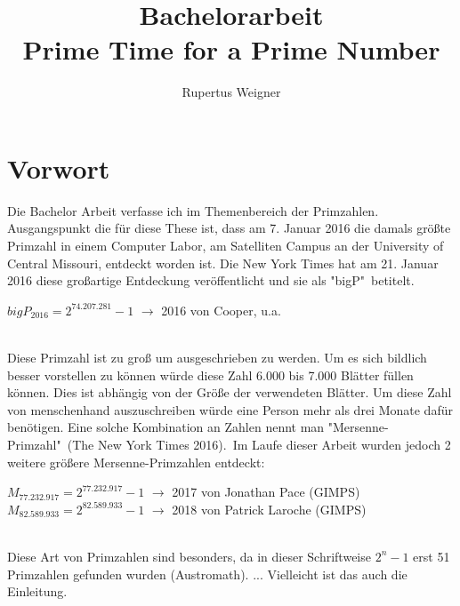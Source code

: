 \documentclass[german,12pt,a4paper]{article}
\title{Bachelorarbeit\\Prime Time for a Prime Number}
\author{Rupertus Weigner}
\begin{document}
\maketitle
\thispagestyle{empty}
\newpage

\section*{Vorwort}
Die Bachelor Arbeit verfasse ich im Themenbereich der Primzahlen. Ausgangspunkt die für diese These ist, dass am 7. Januar 2016 die damals größte Primzahl in einem Computer Labor, am Satelliten Campus an der University of Central Missouri, entdeckt worden ist. Die New York Times hat am 21. Januar 2016 diese großartige Entdeckung veröffentlicht und sie als "bigP"\ betitelt.\\
\begin{center}
$bigP_{2016} = 2^{74.207.281}-1$ $\rightarrow$ 2016 von Cooper, u.a.
\end{center}\
\\Diese Primzahl ist zu groß um ausgeschrieben zu werden. Um es sich bildlich besser vorstellen zu können würde diese Zahl 6.000 bis 7.000 Blätter füllen können. Dies ist abhängig von der Größe der verwendeten Blätter. Um diese Zahl von menschenhand auszuschreiben würde eine Person mehr als drei Monate dafür benötigen. Eine solche Kombination an Zahlen nennt man "Mersenne-Primzahl"\ (The New York Times 2016).\
Im Laufe dieser Arbeit wurden jedoch 2 weitere größere Mersenne-Primzahlen entdeckt:\\
\begin{center}
$M_{77.232.917} = 2^{77.232.917}-1$ $\rightarrow$ 2017 von Jonathan Pace (GIMPS)\\
$M_{82.589.933} = 2^{82.589.933}-1$ $\rightarrow$ 2018 von Patrick Laroche (GIMPS)
\end{center}\
\\Diese Art von Primzahlen sind besonders, da in dieser Schriftweise $2^n-1$ erst 51 Primzahlen gefunden wurden (Austromath). ... Vielleicht ist das auch die Einleitung.
\newpage

\tableofcontents
\thispagestyle{empty}
\newpage
\end{document}
